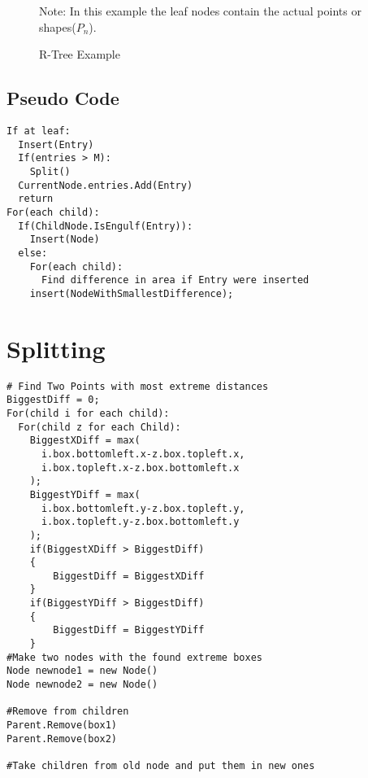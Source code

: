 \documentclass{article}
\begin{document}
\begin{figure}[h]
\caption{R-Tree Example}
\centering
{}

Note: In this example the leaf nodes contain the actual points or shapes($P_n$).
\end{figure}



\subsection*{Pseudo Code}

\begin{lstlisting}    
If at leaf:
  Insert(Entry)
  If(entries > M):
    Split()
  CurrentNode.entries.Add(Entry)
  return
For(each child):
  If(ChildNode.IsEngulf(Entry)):
    Insert(Node)
  else:
    For(each child):
      Find difference in area if Entry were inserted
    insert(NodeWithSmallestDifference);
\end{lstlisting}


\section{Splitting} 
\begin{lstlisting}
# Find Two Points with most extreme distances
BiggestDiff = 0;
For(child i for each child):
  For(child z for each Child):
    BiggestXDiff = max(
      i.box.bottomleft.x-z.box.topleft.x,
      i.box.topleft.x-z.box.bottomleft.x
    );
    BiggestYDiff = max(
      i.box.bottomleft.y-z.box.topleft.y,
      i.box.topleft.y-z.box.bottomleft.y
    );
    if(BiggestXDiff > BiggestDiff)
    {
        BiggestDiff = BiggestXDiff
    }
    if(BiggestYDiff > BiggestDiff)
    {
        BiggestDiff = BiggestYDiff
    }
#Make two nodes with the found extreme boxes
Node newnode1 = new Node()
Node newnode2 = new Node()

#Remove from children
Parent.Remove(box1)
Parent.Remove(box2)

#Take children from old node and put them in new ones


\end{lstlisting}
\end{document}
